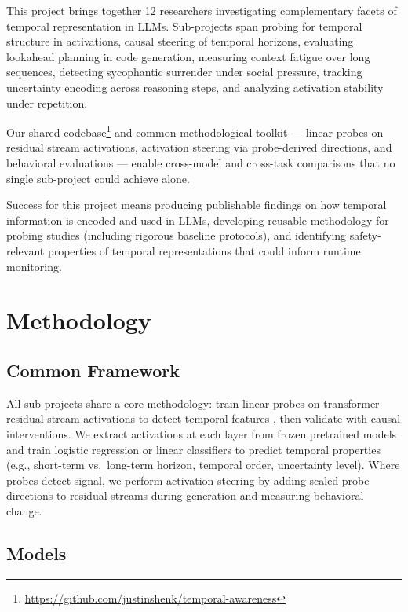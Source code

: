 \documentclass[midterm]{sparreport}
\begin{document}
This project brings together 12 researchers investigating complementary facets of temporal representation in LLMs. Sub-projects span probing for temporal structure in activations, causal steering of temporal horizons, evaluating lookahead planning in code generation, measuring context fatigue over long sequences, detecting sycophantic surrender under social pressure, tracking uncertainty encoding across reasoning steps, and analyzing activation stability under repetition.

Our shared codebase\footnote{\url{https://github.com/justinshenk/temporal-awareness}} and common methodological toolkit --- linear probes on residual stream activations, activation steering via probe-derived directions, and behavioral evaluations --- enable cross-model and cross-task comparisons that no single sub-project could achieve alone.

Success for this project means producing publishable findings on how temporal information is encoded and used in LLMs, developing reusable methodology for probing studies (including rigorous baseline protocols), and identifying safety-relevant properties of temporal representations that could inform runtime monitoring.

\section{Methodology}

\subsection{Common Framework}

All sub-projects share a core methodology: train linear probes on transformer residual stream activations to detect temporal features \cite{belinkov2022probing}, then validate with causal interventions. We extract activations at each layer from frozen pretrained models and train logistic regression or linear classifiers to predict temporal properties (e.g., short-term vs.\ long-term horizon, temporal order, uncertainty level). Where probes detect signal, we perform activation steering by adding scaled probe directions to residual streams during generation \cite{li2023inference} and measuring behavioral change.

\subsection{Models}
\end{document}
